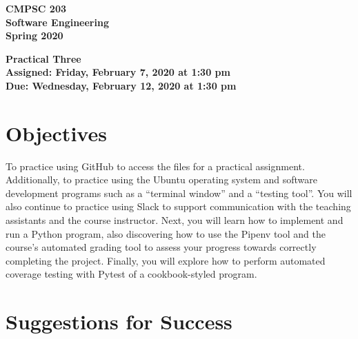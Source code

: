 \documentclass[11pt]{article}
\newcommand{\assignmentduedate}{February 12}
\newcommand{\assignmentassignedate}{February 7}
\newcommand{\assignmentnumber}{Three}
\newcommand{\labyear}{2020}
\newcommand{\labdueday}{Wednesday}
\newcommand{\labassignday}{Friday}
\newcommand{\labtime}{1:30 pm}
\newcommand{\assigneddate}{Assigned: \labassignday, \assignmentassignedate, \labyear{} at \labtime{}}
\newcommand{\duedate}{Due: \labdueday, \assignmentduedate, \labyear{} at \labtime{}}
\newcommand{\labtitle}[1]
{
  \begin{center}
    \begin{center}
      \bf
      CMPSC 203\\Software Engineering\\
      Spring 2020\\
      \medskip
    \end{center}
    \bf
    #1
  \end{center}
}
\begin{document}
\thispagestyle{empty}

\labtitle{Practical \assignmentnumber{} \\ \assigneddate{} \\ \duedate{}}

\section*{Objectives}

To practice using GitHub to access the files for a practical assignment.
Additionally, to practice using the Ubuntu operating system and software
development programs such as a ``terminal window'' and a ``testing tool''. You
will also continue to practice using Slack to support communication with the
teaching assistants and the course instructor. Next, you will learn how to
implement and run a Python program, also discovering how to use the Pipenv tool
and the course's automated grading tool to assess your progress towards
correctly completing the project. Finally, you will explore how to perform
automated coverage testing with Pytest of a cookbook-styled program.

\section*{Suggestions for Success}
\end{document}
